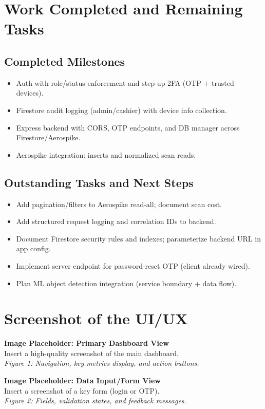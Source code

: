 \documentclass[12pt]{article}
\begin{document}
\section{Work Completed and Remaining Tasks}

\subsection{Completed Milestones}
\begin{itemize}[leftmargin=*]
\item Auth with role/status enforcement and step-up 2FA (OTP + trusted devices).
\item Firestore audit logging (admin/cashier) with device info collection.
\item Express backend with CORS, OTP endpoints, and DB manager across Firestore/Aerospike.
\item Aerospike integration: inserts and normalized scan reads.
\end{itemize}

\subsection{Outstanding Tasks and Next Steps}
\begin{itemize}[leftmargin=*]
\item Add pagination/filters to Aerospike read-all; document scan cost.
\item Add structured request logging and correlation IDs to backend.
\item Document Firestore security rules and indexes; parameterize backend URL in app config.
\item Implement server endpoint for password-reset OTP (client already wired).
\item Plan ML object detection integration (service boundary + data flow).
\end{itemize}

\section{Screenshot of the UI/UX}
\textbf{Image Placeholder: Primary Dashboard View}\\
Insert a high-quality screenshot of the main dashboard.\\
\emph{Figure 1: Navigation, key metrics display, and action buttons.}

\textbf{Image Placeholder: Data Input/Form View}\\
Insert a screenshot of a key form (login or OTP).\\
\emph{Figure 2: Fields, validation states, and feedback messages.}
\end{document}
